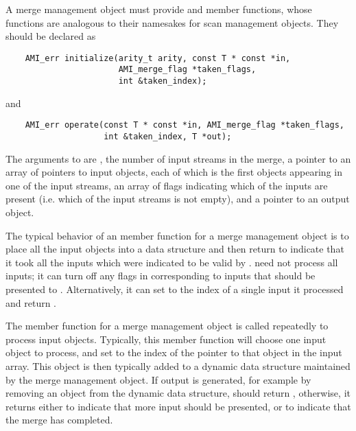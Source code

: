 A merge management object
must provide  and  member
functions, whose functions are analogous to their namesakes for scan
management objects.  They should be declared as
\begin{verbatim}
    AMI_err initialize(arity_t arity, const T * const *in,
                       AMI_merge_flag *taken_flags,
                       int &taken_index);
\end{verbatim}
and
\begin{verbatim}
    AMI_err operate(const T * const *in, AMI_merge_flag *taken_flags,
                    int &taken_index, T *out);
\end{verbatim}
The arguments to  are , the number of
input streams in the merge,  a pointer to an array of
pointers to input objects, each of which is the first objects appearing
in one of the input streams,   an array of flags
indicating which of the inputs are present (i.e. which of the input
streams is not empty), and a pointer to an output object.

The typical behavior of an  member function for a
merge management object is to place all the input objects into a data
structure and then return  to indicate
that it took all the inputs which were indicated to be valid by
.   need not process all inputs; it
can turn off any flags in  corresponding to inputs
that should be presented to .  Alternatively, it can
set  to the index of a single input it processed and
return .

The  member function for a merge management object is
called repeatedly to process input objects.  Typically, this member
function will choose one input object to process, and set
 to the index of the pointer to that object in the input
array.  This object is then typically added to a dynamic data structure
maintained by the merge management object.  If output is generated, for
example by removing an object from the dynamic data structure,
 should return , otherwise, it
returns either  to indicate that more input should
be presented, or  to indicate that the merge has
completed.

